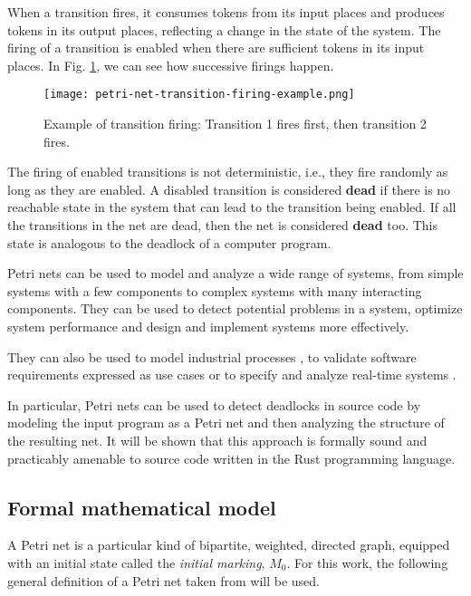 When a transition fires, it consumes tokens from its input places and
produces tokens in its output places, reflecting a change in the state of the system.
The firing of a transition is enabled when there are sufficient tokens in its input places.
In Fig. \ref{fig:petri-net-transition-firing-example}, we can see how successive firings happen.

\begin{figure}[H]
    \centering
    \texttt{[image: petri-net-transition-firing-example.png]}
    \caption{Example of transition firing: Transition 1 fires first, then transition 2 fires.}
    \label{fig:petri-net-transition-firing-example}
\end{figure}

The firing of enabled transitions is not deterministic, i.e., they fire randomly as long as they are enabled.
A disabled transition is considered \textbf{dead}
if there is no reachable state in the system that can lead to the transition being enabled.
If all the transitions in the net are dead, then the net is considered \textbf{dead} too.
This state is analogous to the deadlock of a computer program.

Petri nets can be used to model and analyze a wide range of systems,
from simple systems with a few components to complex systems with many interacting components.
They can be used to detect potential problems in a system,
optimize system performance and design and implement systems more effectively.

They can also be used to model industrial processes \cite{aalst1994putting},
to validate software requirements expressed as use cases \cite{silva2004applying}
or to specify and analyze real-time systems \cite{kavi1996specification}.

In particular, Petri nets can be used to detect deadlocks in source code
by modeling the input program as a Petri net and then analyzing the structure of the resulting net.
It will be shown that this approach is formally sound and
practicably amenable to source code written in the Rust programming language.

\subsection{Formal mathematical model}

A Petri net is a particular kind of bipartite, weighted, directed graph,
equipped with an initial state called the \textit{initial marking}, $M_{0}$.
For this work, the following general definition of a Petri net taken from \cite{murata1989} will be used.

